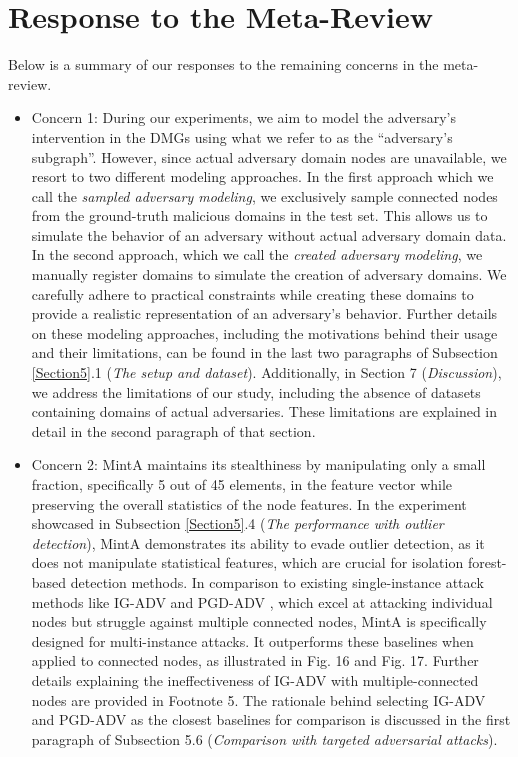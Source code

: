 \documentclass[conference,compsoc]{IEEEtran}
\begin{document}
\section{Response to the Meta-Review} 

\par Below is a summary of our responses to the remaining concerns in the meta-review.

\begin{itemize}
\item Concern 1: During our experiments, we aim to model the adversary's intervention in the DMGs using what we refer to as the ``adversary's subgraph''. However, since actual adversary domain nodes are unavailable, we resort to two different modeling approaches. In the first approach which we call the \textit{sampled adversary modeling}, we exclusively sample connected nodes from the ground-truth malicious domains in the test set. This allows us to simulate the behavior of an adversary without actual adversary domain data. In the second approach, which we call the \textit{created adversary modeling}, we manually register domains to simulate the creation of adversary domains. We carefully adhere to practical constraints while creating these domains to provide a realistic representation of an adversary's behavior. Further details on these modeling approaches, including the motivations behind their usage and their limitations, can be found in the last two paragraphs of Subsection \ref{Section5}.1 (\textit{The setup and dataset}). Additionally, in Section 7 (\textit{Discussion}), we address the limitations of our study, including the absence of datasets containing domains of actual adversaries. These limitations are explained in detail in the second paragraph of that section.

\item Concern 2: MintA maintains its stealthiness by manipulating only a small fraction, specifically 5 out of 45 elements, in the feature vector while preserving the overall statistics of the node features. In the experiment showcased in Subsection \ref{Section5}.4 (\textit{The performance with outlier detection}), MintA demonstrates its ability to evade outlier detection, as it does not manipulate statistical features, which are crucial for isolation forest-based detection methods. In comparison to existing single-instance attack methods like IG-ADV \cite{wu2019adversarial} and PGD-ADV \cite{xu2019topology}, which excel at attacking individual nodes but struggle against multiple connected nodes, MintA is specifically designed for multi-instance attacks. It outperforms these baselines when applied to connected nodes, as illustrated in Fig. 16 and Fig. 17. Further details explaining the ineffectiveness of IG-ADV with multiple-connected nodes are provided in Footnote 5. The rationale behind selecting IG-ADV and PGD-ADV as the closest baselines for comparison is discussed in the first paragraph of Subsection 5.6 (\textit{Comparison with targeted adversarial attacks}).


\end{itemize}
\end{document}
